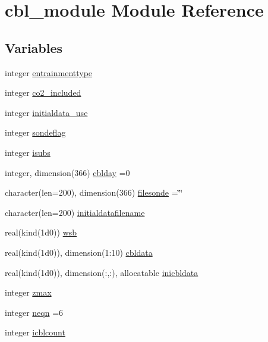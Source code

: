 \hypertarget{namespacecbl__module}{}\section{cbl\+\_\+module Module Reference}
\label{namespacecbl__module}
\subsection*{Variables}
\begin{DoxyCompactItemize}
\item 
integer \hyperlink{namespacecbl__module_a904519e3dcaa1592e2506c840b8cc7e4}{entrainmenttype}
\item 
integer \hyperlink{namespacecbl__module_a1fe4af3f4b8ea35de69189177bcc9d5d}{co2\+\_\+included}
\item 
integer \hyperlink{namespacecbl__module_ad06cbd2f8723521c7d20e7d57ebe0f9c}{initialdata\+\_\+use}
\item 
integer \hyperlink{namespacecbl__module_a546f4ac8b1d6305356caf940d8e8e342}{sondeflag}
\item 
integer \hyperlink{namespacecbl__module_a0140016345794a8912c00aafaf50fe1e}{isubs}
\item 
integer, dimension(366) \hyperlink{namespacecbl__module_a5901bc487fe54be32f04988c42ab7443}{cblday} =0
\item 
character(len=200), dimension(366) \hyperlink{namespacecbl__module_a810011542edd41ab403379b2004c84ab}{filesonde} =\char`\"{}\char`\"{}
\item 
character(len=200) \hyperlink{namespacecbl__module_add8682c29dcc92f528e2894dd1e16f39}{initialdatafilename}
\item 
real(kind(1d0)) \hyperlink{namespacecbl__module_acdfa6106091fdfa93a6cab25af3d0f1a}{wsb}
\item 
real(kind(1d0)), dimension(1\+:10) \hyperlink{namespacecbl__module_aae12ee171bb6806332a07b9300284693}{cbldata}
\item 
real(kind(1d0)), dimension(\+:,\+:), allocatable \hyperlink{namespacecbl__module_ae82d92a08db006da8495afa687a74c6c}{inicbldata}
\item 
integer \hyperlink{namespacecbl__module_ad6ee0356644a1bc5acc13c4dc71ad4f9}{zmax}
\item 
integer \hyperlink{namespacecbl__module_a52c76c9e4368adec7890e95932374f73}{neqn} =6
\item 
integer \hyperlink{namespacecbl__module_a105bb269b58c37d9b6170f7aa3a74fbe}{icblcount}
\item 

\end{DoxyCompactItemize}
